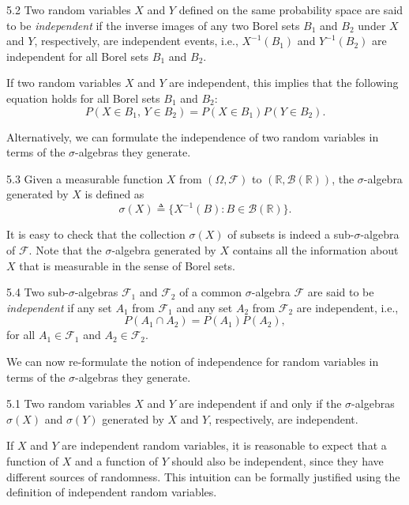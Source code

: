 \begin{defbox}{5.2}
Two random variables $X$ and $Y$ defined on the same probability space are said to be \textit{independent} if the inverse images of any two Borel sets $B_1$ and $B_2$ under $X$ and $Y$, respectively, are independent events, i.e., $X^{-1}(B_1)$ and $Y^{-1}(B_2)$ are independent for all Borel sets $B_1$ and $B_2$.

If two random variables $X$ and $Y$ are independent, this implies that the following equation holds for all Borel sets $B_1$ and $B_2$:
\[
P(X \in B_1,\, Y \in B_2) = P(X \in B_1)P(Y \in B_2).
\]
\end{defbox}

Alternatively, we can formulate the independence of two random variables in terms of the $\sigma$-algebras they generate.

\begin{defbox}{5.3}
Given a measurable function $X$ from $(\Omega,\mathcal{F})$ to $(\mathbb{R},\mathcal{B}(\mathbb{R}))$, the $\sigma$-algebra generated by $X$ is defined as
\[
\sigma(X) \triangleq \{X^{-1}(B) : B \in \mathcal{B}(\mathbb{R})\}.
\]

It is easy to check that the collection $\sigma(X)$ of subsets is indeed a sub-$\sigma$-algebra of $\mathcal{F}$. Note that the $\sigma$-algebra generated by $X$ contains all the information about $X$ that is measurable in the sense of Borel sets.
\end{defbox}

\begin{defbox}{5.4}
Two sub-$\sigma$-algebras $\mathcal{F}_1$ and $\mathcal{F}_2$ of a common $\sigma$-algebra $\mathcal{F}$ are said to be \textit{independent} if any set $A_1$ from $\mathcal{F}_1$ and any set $A_2$ from $\mathcal{F}_2$ are independent, i.e.,
\[
P(A_1 \cap A_2) = P(A_1)P(A_2),
\]
for all $A_1 \in \mathcal{F}_1$ and $A_2 \in \mathcal{F}_2$.
\end{defbox}

We can now re-formulate the notion of independence for random variables in terms of the $\sigma$-algebras they generate.

\begin{thmbox}{5.1}
Two random variables $X$ and $Y$ are independent if and only if the $\sigma$-algebras $\sigma(X)$ and $\sigma(Y)$ generated by $X$ and $Y$, respectively, are independent.
\end{thmbox}

If $X$ and $Y$ are independent random variables, it is reasonable to expect that a function of $X$ and a function of $Y$ should also be independent, since they have different sources of randomness. This intuition can be formally justified using the definition of independent random variables.

